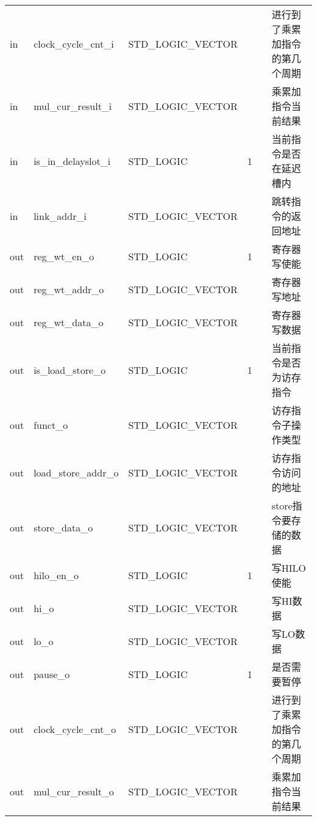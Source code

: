 \documentclass{article}
\begin{document}
\begin{center}
\begin{supertabular}{lllllp{2cm}}
    in & clock_cycle_cnt_i\label{EX:clock_cycle_cnt_i} & STD_LOGIC_VECTOR &  &  & 进行到了乘累加指令的第几个周期 \\
    in & mul_cur_result_i\label{EX:mul_cur_result_i} & STD_LOGIC_VECTOR &  &  & 乘累加指令当前结果 \\
    in & is_in_delayslot_i\label{EX:is_in_delayslot_i} & STD_LOGIC & 1 &  & 当前指令是否在延迟槽内 \\
    in & link_addr_i\label{EX:link_addr_i} & STD_LOGIC_VECTOR &  &  & 跳转指令的返回地址 \\
    out & reg_wt_en_o\label{EX:reg_wt_en_o} & STD_LOGIC & 1 &  & 寄存器写使能 \\
    out & reg_wt_addr_o\label{EX:reg_wt_addr_o} & STD_LOGIC_VECTOR &  &  & 寄存器写地址 \\
    out & reg_wt_data_o\label{EX:reg_wt_data_o} & STD_LOGIC_VECTOR &  &  & 寄存器写数据 \\
    out & is_load_store_o\label{EX:is_load_store_o} & STD_LOGIC & 1 &  & 当前指令是否为访存指令 \\
    out & funct_o\label{EX:funct_o} & STD_LOGIC_VECTOR &  &  & 访存指令子操作类型 \\
    out & load_store_addr_o\label{EX:load_store_addr_o} & STD_LOGIC_VECTOR &  &  & 访存指令访问的地址 \\
    out & store_data_o\label{EX:store_data_o} & STD_LOGIC_VECTOR &  &  & store指令要存储的数据 \\
    out & hilo_en_o\label{EX:hilo_en_o} & STD_LOGIC & 1 &  & 写HILO使能 \\
    out & hi_o\label{EX:hi_o} & STD_LOGIC_VECTOR &  &  & 写HI数据 \\
    out & lo_o\label{EX:lo_o} & STD_LOGIC_VECTOR &  &  & 写LO数据 \\
    out & pause_o\label{EX:pause_o} & STD_LOGIC & 1 &  & 是否需要暂停 \\
    out & clock_cycle_cnt_o\label{EX:clock_cycle_cnt_o} & STD_LOGIC_VECTOR &  &  & 进行到了乘累加指令的第几个周期 \\
    out & mul_cur_result_o\label{EX:mul_cur_result_o} & STD_LOGIC_VECTOR &  &  & 乘累加指令当前结果 \\
    \end{supertabular}
\end{center}
\FloatBarrier
\end{document}
